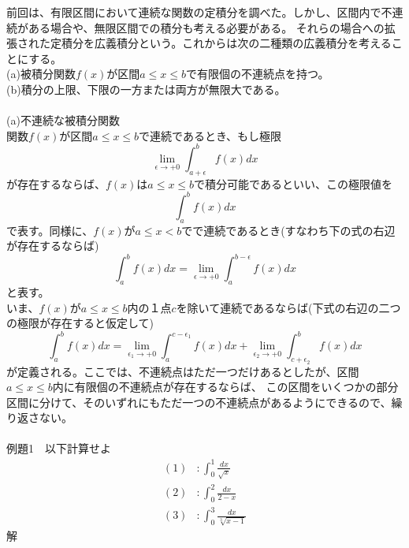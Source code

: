\documentclass[a4j,dvipdfmx]{jsarticle}
\begin{document}
前回は、有限区間において連続な関数の定積分を調べた。しかし、区間内で不連続がある場合や、無限区間での積分も考える必要がある。
それらの場合への拡張された定積分を広義積分という。これからは次の二種類の広義積分を考えることにする。\\
(a)被積分関数$f(x)$が区間$a\leq x\leq b$で有限個の不連続点を持つ。\\
(b)積分の上限、下限の一方または両方が無限大である。\\\\
(a)不連続な被積分関数\\
関数$f(x)$が区間$a \leq x \leq b$で連続であるとき、もし極限
\begin{equation}
    \lim_{\epsilon\to +0}\int_{a+\epsilon}^b f(x)dx
\end{equation}
が存在するならば、$f(x)$は$a\leq x\leq b$で積分可能であるといい、この極限値を
\begin{equation}
    \int_{a}^b f(x)dx
\end{equation}
で表す。同様に、$f(x)$が$a\leq x<b$でで連続であるとき(すなわち下の式の右辺が存在するならば)
\begin{equation}
    \int_{a}^b f(x)dx = \lim_{\epsilon\to +0}\int_a^{b-\epsilon} f(x)dx
\end{equation}
と表す。\\
いま、$f(x)$が$a\leq x\leq b$内の１点$c$を除いて連続であるならば(下式の右辺の二つの極限が存在すると仮定して)
\begin{equation}
    \int_a^b f(x)dx = \lim_{\epsilon_1\to+0}\int_a^{c-\epsilon_1}f(x)dx +\lim_{\epsilon_2\to+0}\int_{c+\epsilon_2}^bf(x)dx 
\end{equation}
が定義される。ここでは、不連続点はただ一つだけあるとしたが、区間$a\leq x\leq b$内に有限個の不連続点が存在するならば、
この区間をいくつかの部分区間に分けて、そのいずれにもただ一つの不連続点があるようにできるので、繰り返さない。\\\\
例題1　以下計算せよ\\
\begin{align*}
    (1)&:\int_0^1\frac{dx}{\sqrt{x}}\\
    (2)&:\int_0^2\frac{dx}{2-x}\\
    (3)&:\int_0^3\frac{dx}{\sqrt[3]{x-1}}
\end{align*}
解\\
\end{document}
